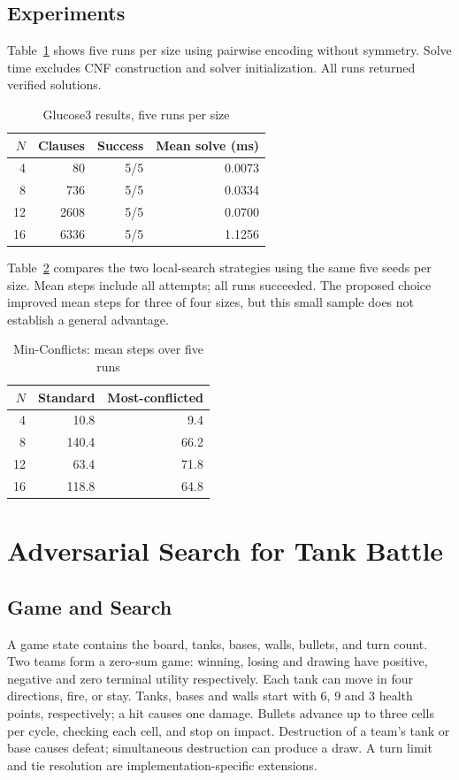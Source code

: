 \documentclass[conference]{IEEEtran}
\begin{document}
\subsection{Experiments}
Table~\ref{sat} shows five runs per size using pairwise encoding without symmetry. Solve time excludes CNF construction and solver initialization. All runs returned verified solutions.
\begin{table}[htbp]\caption{Glucose3 results, five runs per size}\label{sat}\centering
    \begin{tabular}{rrrr}\hline \(N\) & Clauses & Success & Mean solve (ms) \\\hline
                   4                & 80      & 5/5     & 0.0073          \\8 & 736 & 5/5 & 0.0334\\12 & 2608 & 5/5 & 0.0700\\16 & 6336 & 5/5 & 1.1256\\\hline\end{tabular}\end{table}
Table~\ref{local} compares the two local-search strategies using the same five seeds per size. Mean steps include all attempts; all runs succeeded. The proposed choice improved mean steps for three of four sizes, but this small sample does not establish a general advantage.
\begin{table}[htbp]\caption{Min-Conflicts: mean steps over five runs}\label{local}\centering
    \begin{tabular}{rrr}\hline \(N\) & Standard & Most-conflicted \\\hline
                   4               & 10.8     & 9.4             \\8 & 140.4 & 66.2\\12 & 63.4 & 71.8\\16 & 118.8 & 64.8\\\hline\end{tabular}\end{table}
\section{Adversarial Search for Tank Battle}
\subsection{Game and Search}
A game state contains the board, tanks, bases, walls, bullets, and turn count. Two teams form a zero-sum game: winning, losing and drawing have positive, negative and zero terminal utility respectively. Each tank can move in four directions, fire, or stay. Tanks, bases and walls start with 6, 9 and 3 health points, respectively; a hit causes one damage. Bullets advance up to three cells per cycle, checking each cell, and stop on impact. Destruction of a team's tank or base causes defeat; simultaneous destruction can produce a draw. A turn limit and tie resolution are implementation-specific extensions.
\end{document}
